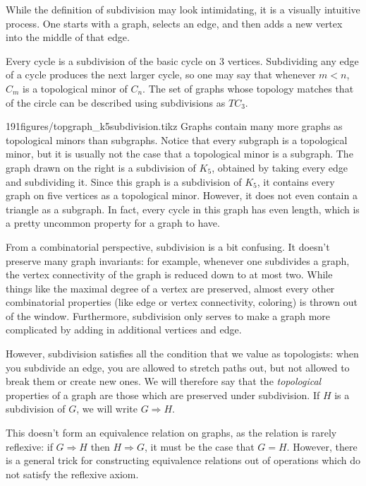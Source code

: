 While the definition of subdivision may look intimidating, it is a visually intuitive process.
One starts with a graph, selects an edge, and then adds a new vertex into the middle of that edge. 

Every cycle is a subdivision of the basic cycle on 3 vertices. Subdividing any edge of a cycle produces the next larger cycle, so one may say that whenever $m<n$, $C_m$ is a topological minor of $C_n$. The set of graphs whose topology matches that of the circle can be described using subdivisions as $TC_3$. 

\begin{examplefigureenv}[$K_5$ Subdivision]{191figures/topgraph_k5subdivision.tikz}
Graphs contain many more graphs as topological minors than subgraphs.
Notice that every subgraph is a topological minor, but it is usually not the case that a topological minor is a subgraph.
The graph drawn on the right is a subdivision of $K_5$, obtained by taking every edge and subdividing it.
Since this graph is a subdivision of $K_5$, it contains every graph on five vertices as a topological minor.
However, it does not even contain a triangle as a subgraph. 
In fact, every cycle in this graph has even length, which is a pretty uncommon property for a graph to have. 
\end{examplefigureenv}

From a combinatorial perspective, subdivision is a bit confusing.
It doesn't preserve many graph invariants: for example, whenever one subdivides a graph, the vertex connectivity of the graph is reduced down to at most two. 
While things like the maximal degree of a vertex are preserved, almost every other combinatorial properties (like edge or vertex connectivity, coloring) is thrown out of the window. Furthermore, subdivision only serves to make a graph more complicated by adding in additional vertices and edge. 

However, subdivision satisfies all the condition that we value as topologists: when you subdivide an edge, you are allowed to stretch paths out, but  not allowed to break them or create new ones. We will therefore say that the \emph{topological} properties of a graph are those which are preserved under subdivision.
If $H$ is a subdivision of $G$, we will write $G\Rightarrow H$. 

This doesn't form an equivalence relation on graphs, as the relation is rarely reflexive: if $G\Rightarrow H$ then $H\Rightarrow G$, it must be the case that $G=H$. 
However, there is a general trick for constructing equivalence relations out of operations which do not satisfy the reflexive axiom. 

